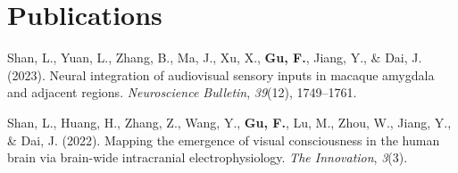 \documentclass[11pt,a4paper,]{awesome-cv}
\newlength{\cslhangindent}
\newenvironment{CSLReferences}[2] %
 {\begin{list}{}{%
  \setlength{\itemindent}{0pt}
  \setlength{\leftmargin}{0pt}
  \setlength{\parsep}{0pt}
  \ifodd #1
   \setlength{\leftmargin}{\cslhangindent}
   \setlength{\itemindent}{-1\cslhangindent}
  \fi
  \setlength{\itemsep}{#2\baselineskip}}}
 {\end{list}}
\begin{document}
\section{Publications}\label{publications}

\label{refs-53a763a6c504681c74a56434e1adcb5a}
\begin{CSLReferences}{1}{0}
Shan, L., Yuan, L., Zhang, B., Ma, J., Xu, X., \textbf{Gu, F.}, Jiang,
Y., \& Dai, J. (2023). Neural integration of audiovisual sensory inputs
in macaque amygdala and adjacent regions. \emph{Neuroscience Bulletin},
\emph{39}(12), 1749--1761.

Shan, L., Huang, H., Zhang, Z., Wang, Y., \textbf{Gu, F.}, Lu, M., Zhou,
W., Jiang, Y., \& Dai, J. (2022). Mapping the emergence of visual
consciousness in the human brain via brain-wide intracranial
electrophysiology. \emph{The Innovation}, \emph{3}(3).

\end{CSLReferences}
\end{document}
